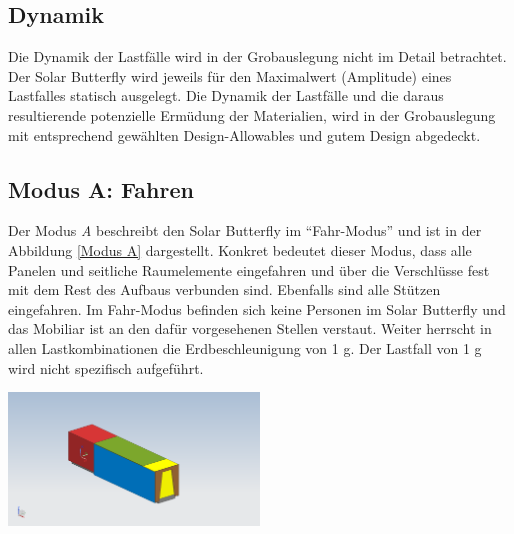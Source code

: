 \subsection{Dynamik}
Die Dynamik der Lastfälle wird in der Grobauslegung nicht im Detail betrachtet. Der Solar Butterfly wird jeweils für den Maximalwert (Amplitude) eines Lastfalles statisch ausgelegt. Die Dynamik der Lastfälle und die daraus resultierende potenzielle Ermüdung der Materialien, wird in der Grobauslegung mit entsprechend gewählten Design-Allowables und gutem Design abgedeckt.

\subsection{Modus A: Fahren}
Der Modus \emph{A} beschreibt den Solar Butterfly im ``Fahr-Modus'' und ist in der Abbildung \ref{Modus A} dargestellt. Konkret bedeutet dieser Modus, dass alle Panelen und seitliche Raumelemente eingefahren und über die Verschlüsse fest mit dem Rest des Aufbaus verbunden sind. Ebenfalls sind alle Stützen eingefahren. Im Fahr-Modus befinden sich keine Personen im Solar Butterfly und das Mobiliar ist an den dafür vorgesehenen Stellen verstaut. Weiter herrscht in allen Lastkombinationen die Erdbeschleunigung von 1 g. Der Lastfall von 1 g wird nicht spezifisch aufgeführt.

\begin{center}
  \includegraphics[width=0.5\textwidth]{04_Figures/A.png}
  \label{Modus A}
\end{center}

